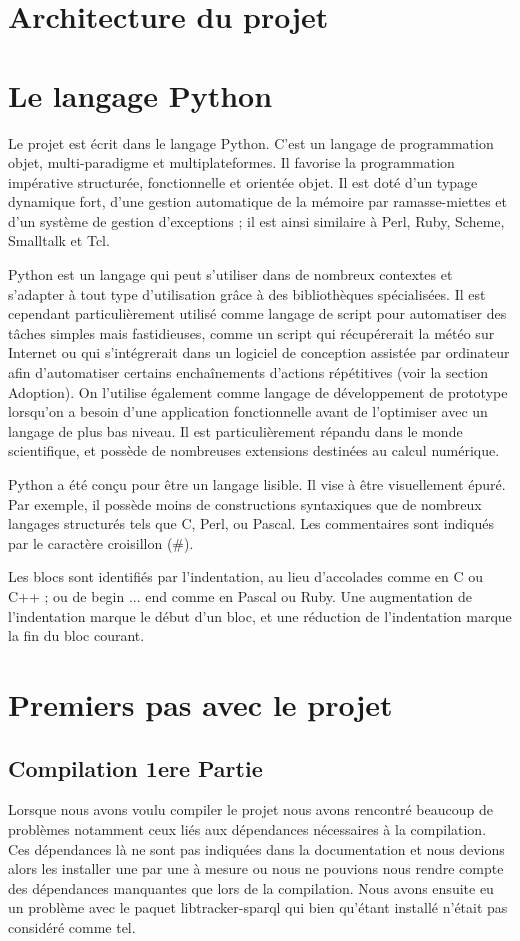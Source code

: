 \documentclass[12pt]{report}
\begin{document}
\section{Architecture du projet}

\section{Le langage Python}
Le projet est écrit dans le langage Python. C'est un langage de
programmation objet, multi-paradigme et multiplateformes. Il favorise la
programmation impérative structurée, fonctionnelle et orientée objet. 
Il est doté d'un typage dynamique fort, d'une gestion automatique de la 
mémoire par ramasse-miettes et d'un système de gestion d'exceptions ; 
il est ainsi similaire à Perl, Ruby, Scheme, Smalltalk et Tcl.

Python est un langage qui peut s'utiliser dans de nombreux contextes 
et s'adapter à tout type d'utilisation grâce à des bibliothèques 
spécialisées. Il est cependant particulièrement utilisé comme 
langage de script pour automatiser des tâches simples mais 
fastidieuses, comme un script qui récupérerait la météo sur Internet 
ou qui s'intégrerait dans un logiciel de conception assistée par 
ordinateur afin d'automatiser certains enchaînements d'actions 
répétitives (voir la section Adoption). On l'utilise également comme 
langage de développement de prototype lorsqu'on a besoin d'une 
application fonctionnelle avant de l'optimiser avec un langage 
de plus bas niveau. Il est particulièrement répandu dans le monde 
scientifique, et possède de nombreuses extensions destinées au 
calcul numérique.

Python a été conçu pour être un langage lisible. Il vise à être 
visuellement épuré. Par exemple, il possède moins de constructions 
syntaxiques que de nombreux langages structurés tels que C, 
Perl, ou Pascal. Les commentaires sont indiqués par le caractère 
croisillon (\#).

Les blocs sont identifiés par l'indentation, au lieu d'accolades 
comme en C ou C++ ; ou de begin ... end comme en Pascal ou Ruby. 
Une augmentation de l'indentation marque le début d'un bloc, et 
une réduction de l'indentation marque la fin du bloc courant. 

\section{Premiers pas avec le projet}
\subsection{Compilation 1ere Partie}
Lorsque nous avons voulu compiler le projet nous avons rencontré 
beaucoup de problèmes notamment ceux liés aux dépendances nécessaires
à la compilation. Ces dépendances là ne sont pas indiquées dans la
documentation et nous devions alors les installer une par une à
mesure ou nous ne pouvions nous rendre compte des dépendances 
manquantes que lors de la compilation. 
Nous avons ensuite eu un problème avec le paquet libtracker-sparql
qui bien qu'étant installé n’était pas considéré comme tel.
\end{document}
